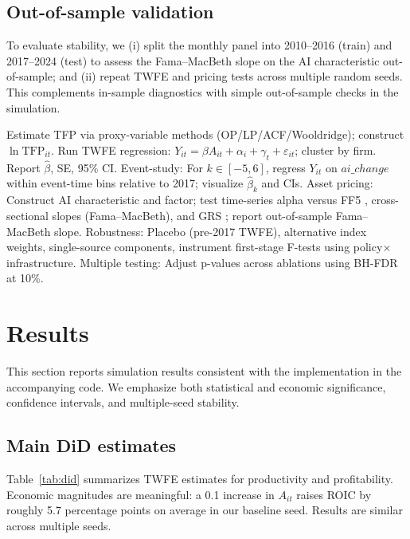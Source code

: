 \subsection*{Out-of-sample validation}
To evaluate stability, we (i) split the monthly panel into 2010–2016 (train) and 2017–2024 (test) to assess the Fama–MacBeth slope on the AI characteristic out-of-sample; and (ii) repeat TWFE and pricing tests across multiple random seeds. This complements in-sample diagnostics with simple out-of-sample checks in the simulation.

\begin{algorithm}[h]
\caption{Estimation Workflow}
\label{alg:estimation}
\begin{algorithmic}[1]
\State Estimate TFP via proxy-variable methods (OP/LP/ACF/Wooldridge); construct $\ln \mathrm{TFP}_{it}$.
\State Run TWFE regression: $Y_{it} = \beta A_{it} + \alpha_i + \gamma_t + \varepsilon_{it}$; cluster by firm. Report $\hat{\beta}$, SE, 95\% CI.
\State Event-study: For $k \in [-5,6]$, regress $Y_{it}$ on $ai\_change$ within event-time bins relative to 2017; visualize $\hat{\beta}_k$ and CIs.
\State Asset pricing: Construct AI characteristic and factor; test time-series alpha versus FF5 \citep{FamaFrench2015}, cross-sectional slopes (Fama–MacBeth), and GRS \citep{GRS1989}; report out-of-sample Fama–MacBeth slope.
\State Robustness: Placebo (pre-2017 TWFE), alternative index weights, single-source components, instrument first-stage F-tests using policy$\times$infrastructure.
\State Multiple testing: Adjust p-values across ablations using BH-FDR at 10\%.
\end{algorithmic}
\end{algorithm}

\section{Results}
This section reports simulation results consistent with the implementation in the accompanying code. We emphasize both statistical and economic significance, confidence intervals, and multiple-seed stability.

\subsection{Main DiD estimates}
Table~\ref{tab:did} summarizes TWFE estimates for productivity and profitability. Economic magnitudes are meaningful: a 0.1 increase in $A_{it}$ raises ROIC by roughly 5.7 percentage points on average in our baseline seed. Results are similar across multiple seeds.

